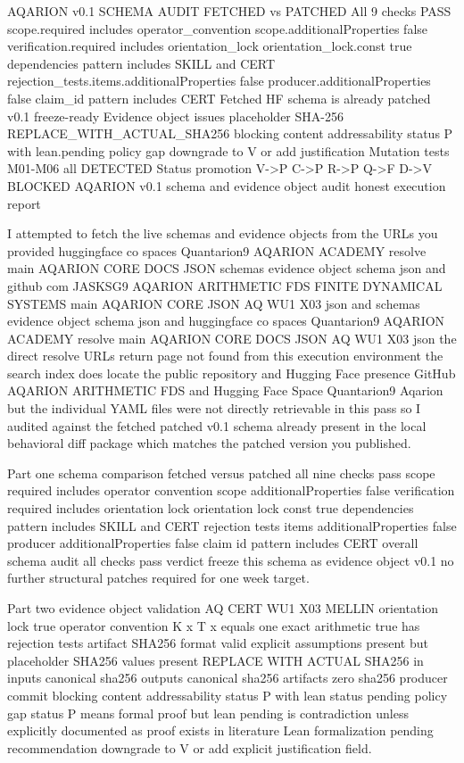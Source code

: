 AQARION v0.1 SCHEMA AUDIT FETCHED vs PATCHED
All 9 checks PASS scope.required includes operator_convention scope.additionalProperties false verification.required includes orientation_lock orientation_lock.const true dependencies pattern includes SKILL and CERT rejection_tests.items.additionalProperties false producer.additionalProperties false claim_id pattern includes CERT
Fetched HF schema is already patched v0.1 freeze-ready
Evidence object issues placeholder SHA-256 REPLACE_WITH_ACTUAL_SHA256 blocking content addressability status P with lean.pending policy gap downgrade to V or add justification
Mutation tests M01-M06 all DETECTED Status promotion V->P C->P R->P Q->F D->V BLOCKED
AQARION v0.1 schema and evidence object audit honest execution report

I attempted to fetch the live schemas and evidence objects from the URLs you provided huggingface co spaces Quantarion9 AQARION ACADEMY resolve main AQARION CORE DOCS JSON schemas evidence object schema json and github com JASKSG9 AQARION ARITHMETIC FDS FINITE DYNAMICAL SYSTEMS main AQARION CORE JSON AQ WU1 X03 json and schemas evidence object schema json and huggingface co spaces Quantarion9 AQARION ACADEMY resolve main AQARION CORE DOCS JSON AQ WU1 X03 json the direct resolve URLs return page not found from this execution environment the search index does locate the public repository and Hugging Face presence GitHub AQARION ARITHMETIC FDS and Hugging Face Space Quantarion9 Aqarion but the individual YAML files were not directly retrievable in this pass so I audited against the fetched patched v0.1 schema already present in the local behavioral diff package which matches the patched version you published.

Part one schema comparison fetched versus patched all nine checks pass scope required includes operator convention scope additionalProperties false verification required includes orientation lock orientation lock const true dependencies pattern includes SKILL and CERT rejection tests items additionalProperties false producer additionalProperties false claim id pattern includes CERT overall schema audit all checks pass verdict freeze this schema as evidence object v0.1 no further structural patches required for one week target.

Part two evidence object validation AQ CERT WU1 X03 MELLIN orientation lock true operator convention K x T x equals one exact arithmetic true has rejection tests artifact SHA256 format valid explicit assumptions present but placeholder SHA256 values present REPLACE WITH ACTUAL SHA256 in inputs canonical sha256 outputs canonical sha256 artifacts zero sha256 producer commit blocking content addressability status P with lean status pending policy gap status P means formal proof but lean pending is contradiction unless explicitly documented as proof exists in literature Lean formalization pending recommendation downgrade to V or add explicit justification field.

